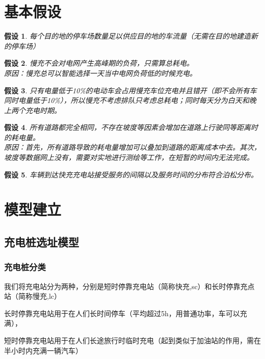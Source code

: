 \documentclass[12pt, a4paper, oneside]{ctexart}
\newtheorem{assumption}{假设}[section]
\begin{document}
\section{基本假设}
\begin{assumption}\label{asmp:lcpark}
    每个目的地的停车场数量足以供应目的地的车流量（无需在目的地建造新的停车场）
\end{assumption}
\begin{assumption}\label{asmp:lcload}
    慢充不会对电网产生高峰期的负荷，只需算总耗电。\\
    原因：慢充总可以智能选择一天当中电网负荷低的时候充电。
\end{assumption}
\begin{assumption}\label{asmp:lcoccupy}
    只有电量低于10\%的电动车会占用慢充车位充电并且错开（即不会所有车同时电量低于10\%），所以慢充不考虑排队只考虑总耗电；同时每天分为白天和晚上两个充电时期。
\end{assumption}
\begin{assumption}\label{asmp:cost}
    所有道路都完全相同，不存在坡度等因素会增加在道路上行驶同等距离时的耗电量。\\
    原因：首先，所有道路导致的耗电量增加可以叠加到道路的距离成本中去。其次，坡度等数据网上没有，需要对实地进行测绘等工作，在短暂的时间内无法完成。
\end{assumption}
\begin{assumption}
    \label{asmp:serve}
    车辆到达快充充电站接受服务的间隔以及服务时间的分布符合泊松分布。
\end{assumption}


\section{模型建立}
\subsection{充电桩选址模型}
\subsubsection{充电桩分类}
我们将充电站分为两种，分别是短时停靠充电站（简称快充,sc）和长时停靠充点站（简称慢充,lc）

长时停靠充电站用于在人们长时间停车（平均超过5h，用普通功率，车可以充满），

短时停靠充电站用于在人们长途旅行时临时充电（起到类似于加油站的作用，需在半小时内充满一辆汽车）
\end{document}
